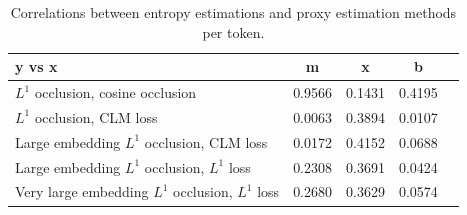 \documentclass{article}
\begin{document}
    \begin{center}
    \begin{table}[H]
    \begin{center}
    \renewcommand{\arraystretch}{1.2}
    \begin{tabular}{||l c c c c ||} 
     \hline
      y vs x & m & x & b &\\ [0.5ex] 
     \hline\hline
      $L^1$ occlusion, cosine occlusion & 0.9566 & 0.1431 &  0.4195 &\\
     \hline
      $L^1$ occlusion, CLM loss & 0.0063 & 0.3894 &0.0107 & \\ 
     \hline
     Large embedding $L^1$ occlusion, CLM loss & 0.0172 & 0.4152 & 0.0688 & \\
     \hline 
     Large embedding $L^1$ occlusion, $L^1$ loss & 0.2308 & 0.3691 & 0.0424 & \\
     \hline
     Very large embedding $L^1$ occlusion, $L^1$ loss & 0.2680 & 0.3629 & 0.0574 & \\
     \hline
    \end{tabular}
    \end{center}
    \vspace{0.1cm}
    \caption{Correlations between entropy estimations and proxy estimation methods per token.}
    \label{tables1}
    \end{table}
    \end{center}
\end{document}
